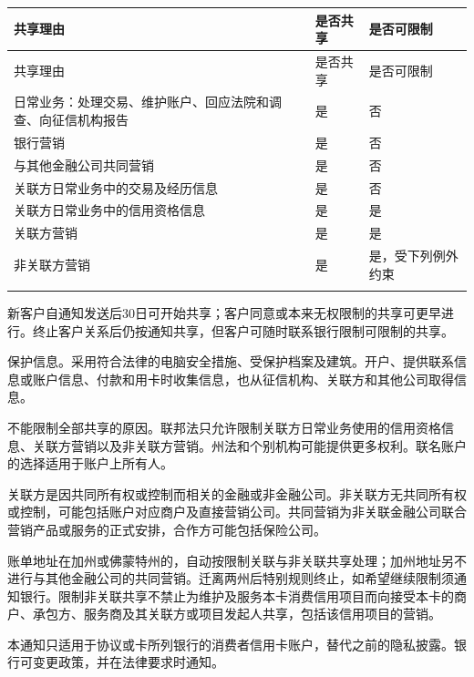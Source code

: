 \documentclass[UTF8,fontset=none,11pt,a4paper]{ctexart}
\begin{document}
\begingroup\small\setlength{\tabcolsep}{4pt}\renewcommand{\arraystretch}{1.35}
\begin{longtable}{>{\raggedright\arraybackslash}p{0.24\dimexpr\linewidth-6\tabcolsep\relax}>{\raggedright\arraybackslash}p{0.38\dimexpr\linewidth-6\tabcolsep\relax}>{\raggedright\arraybackslash}p{0.38\dimexpr\linewidth-6\tabcolsep\relax}}
\toprule
\rowcolor{TableHead} 共享理由 & 是否共享 & 是否可限制 \\
\midrule\endfirsthead
\toprule
\rowcolor{TableHead} 共享理由 & 是否共享 & 是否可限制 \\
\midrule\endhead
\midrule\endfoot
\bottomrule\endlastfoot
日常业务：处理交易、维护账户、回应法院和调查、向征信机构报告 & 是 & 否 \\ \addlinespace[3pt]
银行营销 & 是 & 否 \\ \addlinespace[3pt]
与其他金融公司共同营销 & 是 & 否 \\ \addlinespace[3pt]
关联方日常业务中的交易及经历信息 & 是 & 否 \\ \addlinespace[3pt]
关联方日常业务中的信用资格信息 & 是 & 是 \\ \addlinespace[3pt]
关联方营销 & 是 & 是 \\ \addlinespace[3pt]
非关联方营销 & 是 & 是，受下列例外约束 \\ \addlinespace[3pt]
\end{longtable}\endgroup
新客户自通知发送后30日可开始共享；客户同意或本来无权限制的共享可更早进行。终止客户关系后仍按通知共享，但客户可随时联系银行限制可限制的共享。


保护信息。采用符合法律的电脑安全措施、受保护档案及建筑。开户、提供联系信息或账户信息、付款和用卡时收集信息，也从征信机构、关联方和其他公司取得信息。


不能限制全部共享的原因。联邦法只允许限制关联方日常业务使用的信用资格信息、关联方营销以及非关联方营销。州法和个别机构可能提供更多权利。联名账户的选择适用于账户上所有人。


关联方是因共同所有权或控制而相关的金融或非金融公司。非关联方无共同所有权或控制，可能包括账户对应商户及直接营销公司。共同营销为非关联金融公司联合营销产品或服务的正式安排，合作方可能包括保险公司。


账单地址在加州或佛蒙特州的，自动按限制关联与非关联共享处理；加州地址另不进行与其他金融公司的共同营销。迁离两州后特别规则终止，如希望继续限制须通知银行。限制非关联共享不禁止为维护及服务本卡消费信用项目而向接受本卡的商户、承包方、服务商及其关联方或项目发起人共享，包括该信用项目的营销。


本通知只适用于协议或卡所列银行的消费者信用卡账户，替代之前的隐私披露。银行可变更政策，并在法律要求时通知。
\end{document}

